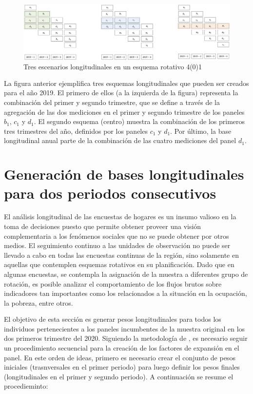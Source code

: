 \documentclass[
  10pt,
  spanish,
]{book}
\begin{document}
\begin{figure}
\centering
\includegraphics{Pics/el1.png}
\caption{Tres escenarios longitudinales en un esquema rotativo 4(0)1}
\end{figure}

La figura anterior ejemplifica tres esquemas longitudinales que pueden ser creados para el año 2019. El primero de ellos (a la izquierda de la figura) representa la combinación del primer y segundo trimestre, que se define a través de la agregación de las dos mediciones en el primer y segundo trimestre de los paneles \(b_1\), \(c_1\) y \(d_1\). El segundo esquema (centro) muestra la combinación de los primeros tres trimestres del año, definidos por los paneles \(c_1\) y \(d_1\). Por último, la base longitudinal anual parte de la combinación de las cuatro mediciones del panel \(d_1\).

\hypertarget{generaciuxf3n-de-bases-longitudinales-para-dos-periodos-consecutivos}{%
\section{Generación de bases longitudinales para dos periodos consecutivos}\label{generaciuxf3n-de-bases-longitudinales-para-dos-periodos-consecutivos}}

El análisis longitudinal de las encuestas de hogares es un insumo valioso en la toma de decisiones puesto que permite obtener proveer una visión complementaria a los fenómenos sociales que no se puede obtener por otros medios. El seguimiento continuo a las unidades de observación no puede ser llevado a cabo en todas las encuestas continuas de la región, sino solamente en aquellas que contemplen esquemas rotativos en su planificación. Dado que en algunas encuestas, se contempla la asignación de la muestra a diferentes grupo de rotación, es posible analizar el comportamiento de los flujos brutos sobre indicadores tan importantes como los relacionados a la situación en la ocupación, la pobreza, entre otros.

El objetivo de esta sección es generar pesos longitudinales para todos los individuos pertenecientes a los paneles incumbentes de la muestra original en los dos primeros trimestre del 2020. Siguiendo la metodología de \citet{Verma_Betti_Ghellini}, es necesario seguir un procedimiento secuencial para la creación de los factores de expansión en el panel. En este orden de ideas, primero es necesario crear el conjunto de pesos iniciales (trasnversales en el primer periodo) para luego definir los pesos finales (longitudinales en el primer y segundo periodo). A continuación se resume el procedieminto:
\end{document}
